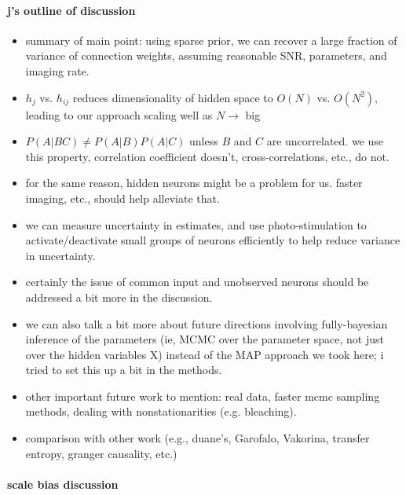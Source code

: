 \paragraph{j's outline of discussion}

\begin{itemize}
\item summary of main point: using sparse prior, we can recover a large fraction of variance of connection weights, assuming reasonable SNR, parameters, and imaging rate.

\item $h_j$ vs. $h_{ij}$ reduces dimensionality of hidden space to $O(N)$ vs. $O(N^2)$, leading to our approach scaling well as $N \rightarrow$ big

\item $P(A|BC)\neq P(A|B)P(A|C)$ unless $B$ and $C$ are uncorrelated.  we use this property, correlation coefficient doesn't, cross-correlations, etc., do not.

\item for the same reason, hidden neurons might be a problem for us.  faster imaging, etc., should help alleviate that.

\item we can measure uncertainty in estimates, and use photo-stimulation to activate/deactivate small groups of neurons efficiently to help reduce variance in uncertainty.

\item certainly the issue of common input and unobserved neurons should be addressed a bit more in the discussion.  

\item we can also talk a bit more about future directions involving fully-bayesian inference of the parameters (ie, MCMC over the parameter space, not just over the hidden variables X) instead of the MAP approach we took here; i tried to set this up a bit in the methods.  

\item other important future work to mention: real data, faster mcmc sampling methods, dealing with nonstationarities (e.g. bleaching).

\item comparison with other work (e.g., duane's, Garofalo, Vakorina, transfer entropy, granger causality, etc.)
\end{itemize}

\paragraph{scale bias discussion}

